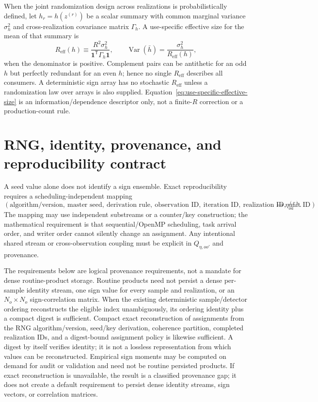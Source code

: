 \documentclass[11pt]{article}
\newcommand{\Var}{\operatorname{Var}}
\newcommand{\one}{\bm{1}}
\begin{document}
When the joint randomization design across realizations is probabilistically
defined, let $h_r=h(z^{(r)})$ be a scalar summary with common marginal variance
$\sigma_h^2$ and cross-realization covariance matrix $\Gamma_h$.  A
use-specific effective size for the mean of that summary is
\begin{equation}
  R_{\mathrm{eff}}(h)
  \equiv
  \frac{R^2\sigma_h^2}{\one^{\mathsf T}\Gamma_h\one},
  \qquad
  \Var(\bar h)=\frac{\sigma_h^2}{R_{\mathrm{eff}}(h)},
  \label{eq:use-specific-effective-size}
\end{equation}
when the denominator is positive.  Complement pairs can be antithetic for an
odd $h$ but perfectly redundant for an even $h$; hence no single
$R_{\mathrm{eff}}$ describes all consumers.  A deterministic sign array has
no stochastic $R_{\mathrm{eff}}$ unless a randomization law over arrays is
also supplied.  Equation~\eqref{eq:use-specific-effective-size} is an
information/dependence descriptor only, not a finite-$R$ correction or a
production-count rule.

\section{RNG, identity, provenance, and reproducibility contract}

A seed value alone does not identify a sign ensemble.  Exact reproducibility
requires a scheduling-independent mapping
\begin{equation}
  (\text{algorithm/version},\ \text{master seed},\ \text{derivation rule},
  \ \text{observation ID},\ \text{iteration ID},\ \text{realization ID},
  \ \text{unit ID})
  \longmapsto\eta_{oa}^{(r)}.
  \label{eq:rng-key-map}
\end{equation}
The mapping may use independent substreams or a counter/key construction; the
mathematical requirement is that sequential/OpenMP scheduling, task arrival
order, and writer order cannot silently change an assignment.  Any intentional
shared stream or cross-observation coupling must be explicit in
$Q_{\eta,oo'}$ and provenance.

The requirements below are logical provenance requirements, not a mandate
for dense routine-product storage.  Routine products need not persist a dense
per-sample identity stream, one sign value for every sample and realization,
or an $N_o\times N_o$ sign-correlation matrix.  When the existing deterministic
sample/detector ordering reconstructs the eligible index unambiguously, its
ordering identity plus a compact digest is sufficient.  Compact exact
reconstruction of assignments from the RNG algorithm/version, seed/key
derivation, coherence partition, completed realization IDs, and a
digest-bound assignment policy is likewise sufficient.  A digest by itself
verifies identity; it is not a lossless representation from which values can
be reconstructed.  Empirical sign moments may be computed on demand for audit
or validation and need not be routine persisted products.  If exact
reconstruction is unavailable, the result is a classified provenance gap; it
does not create a default requirement to persist dense identity streams, sign
vectors, or correlation matrices.
\end{document}
